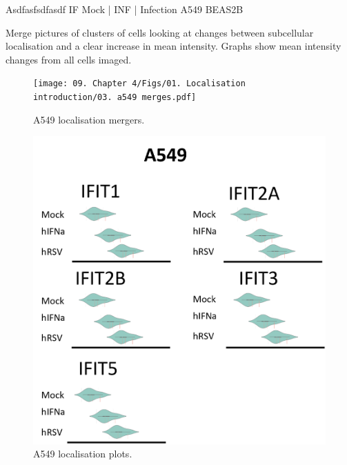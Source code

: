 Asdfasfsdfasdf \newline
IF Mock | INF | Infection \newline
A549 BEAS2B

Merge pictures of clusters of cells looking at changes between subcellular localisation and a clear increase in mean intensity. Graphs show mean intensity changes from all cells imaged.

\begin{figure}
    \centering
    \texttt{[image: 09. Chapter 4/Figs/01. Localisation introduction/03. a549 merges.pdf]}
    \caption[A549 localisation mergers.]{A549 localisation mergers.}
    \label{fig:A549 localisation mergers.}
\end{figure}


\begin{figure}
    \centering
    \includegraphics[width=1\linewidth]{09. Chapter 4/Figs/01. Localisation introduction/04. a549 plots.png}
    \caption[A549 localisation plots.]{A549 localisation plots.}
    \label{fig:A549 localisation plots.}
\end{figure}


